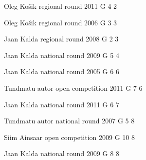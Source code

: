 \documentclass[11pt]{article}
\begin{document}
\ylDisplay{} %
{Oleg Košik} %
{regional round} %
{2011} %
{G 4} %
{2} %
{

\ifEngStatement
\fi
}

\ylDisplay{} %
{Oleg Košik} %
{regional round} %
{2006} %
{G 3} %
{3} %
{

\ifEngStatement
\fi
}

\ylDisplay{} %
{Jaan Kalda} %
{regional round} %
{2008} %
{G 2} %
{3} %
{

\ifEngStatement
\fi
}

\ylDisplay{} %
{Jaan Kalda} %
{national round} %
{2009} %
{G 5} %
{4} %
{

\ifEngStatement
\fi
}

\ylDisplay{} %
{Jaan Kalda} %
{national round} %
{2005} %
{G 6} %
{6} %
{

\ifEngStatement
\fi
}

\ylDisplay{} %
{Tundmatu autor} %
{open competition} %
{2011} %
{G 7} %
{6} %
{

\ifEngStatement
\fi
}

\ylDisplay{} %
{Jaan Kalda} %
{national round} %
{2011} %
{G 6} %
{7} %
{

\ifEngStatement
\fi
}

\ylDisplay{} %
{Tundmatu autor} %
{national round} %
{2007} %
{G 5} %
{8} %
{

\ifEngStatement
\fi
}

\ylDisplay{} %
{Siim Ainsaar} %
{open competition} %
{2009} %
{G 10} %
{8} %
{

\ifEngStatement
\fi
}

\ylDisplay{} %
{Jaan Kalda} %
{national round} %
{2009} %
{G 8} %
{8} %
{

\ifEngStatement
\fi
}
\end{document}
